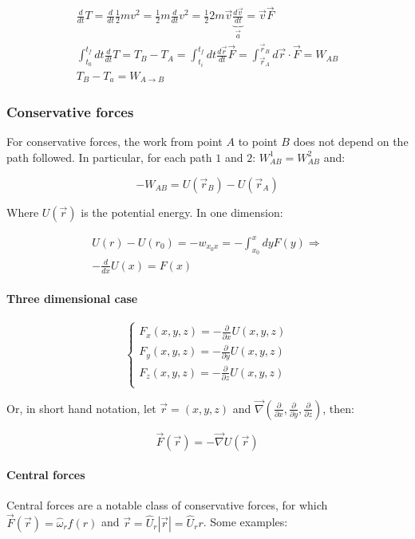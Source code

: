   \begin{align*}
    \frac{d{}}{d{t}}T = \frac{d{}}{d{t}}\frac{1}{2}mv^2 = \frac{1}{2}m \frac{d{}}{d{t}}v^2 = \frac{1}{2}2m \vec{v}\underbrace{\frac{d{\vec{v}}}{d{t}}}_{\vec{a}} = \vec{v} \vec{F}\\
    \int_{t_0}^{t_f}dt \frac{d{}}{d{t}}T = T_B-T_A = \int_{t_i}^{t_f}dt \frac{d{\vec{r}}}{d{t}}\vec{F} = \int_{\vec{r}_A}^{\vec{r}_B} d \vec{r}\cdot \vec{F} = W_{AB}\\
    T_B-T_a = W_{A\rightarrow B}
  \end{align*}

    \subsubsection{Conservative forces}
    For conservative forces, the work from point $A$ to point $B$ does not depend on the path followed. In particular, for each path $1$ and $2$: $W_{AB}^1 = W_{AB}^2$ and:

    $$-W_{AB} = U(\vec{r}_B) - U(\vec{r}_A)$$

    Where $U(\vec{r})$ is the potential energy.
    In one dimension:

    \begin{align*}
      U(r) -U(r_0) = -w_{x_0x} = -\int_{x_0}^xdyF(y) \Rightarrow\\
      -\frac{d{}}{d{x}}U(x) = F(x)
    \end{align*}

      \paragraph{Three dimensional case}

      $$\begin{cases}
        F_x(x,y,z) = - \frac{\partial {}}{\partial {x}}U(x,y,z)\\
        F_y(x,y,z) = - \frac{\partial {}}{\partial {y}}U(x,y,z)\\
        F_z(x,y,z) = - \frac{\partial {}}{\partial {z}}U(x,y,z)\\
      \end{cases}$$

      Or, in short hand notation, let $\vec{r}=(x,y,z)$ and $\vec{\nabla}(\frac{\partial {}}{\partial {x}},\frac{\partial {}}{\partial {y}},\frac{\partial {}}{\partial {z}})$, then:

      $$\vec{F}(\vec{r}) = -\vec{\nabla}U(\vec{r})$$

      \paragraph{Central forces}
      Central forces are a notable class of conservative forces, for which $\vec{F}(\vec{r}) = \hat{\omega}_{r}f(r)$ and $\vec{r} = \hat{U}_{r}|\vec{r}| = \hat{U}_{r}r$.
      Some examples:

